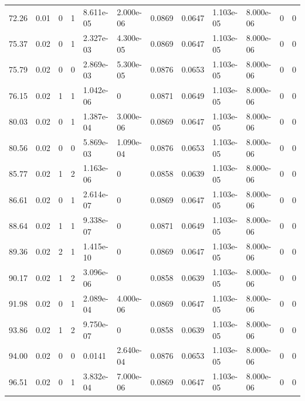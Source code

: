 \documentclass[preview]{standalone}
\begin{document}
{{\begin{tabular}{L{1.2cm}C{1.2cm} C{0.3cm}C{0.5cm} C{1.4cm}C{1.4cm} C{1.4cm}C{1.4cm} C{1.6cm}C{1.6cm} C{1.6cm}C{1.6cm}}
  72.26  &  0.01  & 0     &  1 &  8.611e-05  & 2.000e-06  &  0.0869&   0.0647& 1.103e-05 & 8.000e-06   &  0 & 0  \\ 
  75.37  &  0.02  & 0     &  1 &  2.327e-03  & 4.300e-05  &  0.0869&   0.0647& 1.103e-05 & 8.000e-06   &  0 & 0  \\ 
  75.79  &  0.02  & 0     &  0 &  2.869e-03  & 5.300e-05  &  0.0876&   0.0653& 1.103e-05 & 8.000e-06   &  0 & 0  \\ 
  76.15  &  0.02  & 1     &  1 &  1.042e-06  & 0  &  0.0871&   0.0649& 1.103e-05 & 8.000e-06   &  0 & 0  \\ 
  80.03  &  0.02  & 0     &  1 &  1.387e-04  & 3.000e-06  &  0.0869&   0.0647& 1.103e-05 & 8.000e-06   &  0 & 0  \\ 
  80.56  &  0.02  & 0     &  0 &  5.869e-03  & 1.090e-04  &  0.0876&   0.0653& 1.103e-05 & 8.000e-06   &  0 & 0  \\ 
  85.77  &  0.02  & 1     &  2 &  1.163e-06  & 0  &  0.0858&   0.0639& 1.103e-05 & 8.000e-06   &  0 & 0  \\ 
  86.61  &  0.02  & 0     &  1 &  2.614e-07  & 0  &  0.0869&   0.0647& 1.103e-05 & 8.000e-06   &  0 & 0  \\ 
  88.64  &  0.02  & 1     &  1 &  9.338e-07  & 0  &  0.0871&   0.0649& 1.103e-05 & 8.000e-06   &  0 & 0  \\ 
  89.36  &  0.02  & 2     &  1 &  1.415e-10  & 0  &  0.0869&   0.0647& 1.103e-05 & 8.000e-06   &  0 & 0  \\ 
  90.17  &  0.02  & 1     &  2 &  3.096e-06  & 0  &  0.0858&   0.0639& 1.103e-05 & 8.000e-06   &  0 & 0  \\ 
  91.98  &  0.02  & 0     &  1 &  2.089e-04  & 4.000e-06  &  0.0869&   0.0647& 1.103e-05 & 8.000e-06   &  0 & 0  \\ 
  93.86  &  0.02  & 1     &  2 &  9.750e-07  & 0  &  0.0858&   0.0639& 1.103e-05 & 8.000e-06   &  0 & 0  \\ 
  94.00  &  0.02  & 0     &  0 &  0.0141  & 2.640e-04  &  0.0876&   0.0653& 1.103e-05 & 8.000e-06   &  0 & 0  \\ 
  96.51  &  0.02  & 0     &  1 &  3.832e-04  & 7.000e-06  &  0.0869&   0.0647& 1.103e-05 & 8.000e-06   &  0 & 0  \\ 
\hline 
\end{tabular} 

}}
\end{document}
